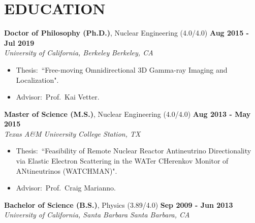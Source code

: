 \section{\small{EDUCATION}}

\textbf{Doctor of Philosophy (Ph.D.)}, Nuclear Engineering (4.0/4.0) \hfill \textbf{Aug 2015 - Jul 2019} \\
\textsl{University of California, Berkeley} \hfill \textsl{Berkeley, CA}\\[-2.8ex]
\vspace{2.5pt}
\begin{itemize}[leftmargin=4ex] \itemsep -2pt
\item Thesis:~``Free-moving Omnidirectional 3D Gamma-ray Imaging and Localization".
\item Advisor:~Prof.~Kai Vetter.
\end{itemize}

\textbf{Master of Science (M.S.)}, Nuclear Engineering (4.0/4.0) \hfill \textbf{Aug 2013 - May 2015} \\
\textsl{Texas A\&M University} \hfill \textsl{College Station, TX}\\[-2.8ex]
\vspace{2.5pt}
\begin{itemize}[leftmargin=4ex] \itemsep -2pt
\item Thesis:~``Feasibility of Remote Nuclear Reactor Antineutrino Directionality via Elastic Electron Scattering in the WATer CHerenkov Monitor of ANtineutrinos (WATCHMAN)".
\item Advisor:~Prof.~Craig Marianno.
\end{itemize}

\textbf{Bachelor of Science (B.S.)}, Physics (3.89/4.0) \hfill \textbf{Sep 2009 - Jun 2013} \\
\textsl{University of California, Santa Barbara} \hfill \textsl{Santa Barbara, CA}\\[-2.8ex]
\vspace{2pt}
